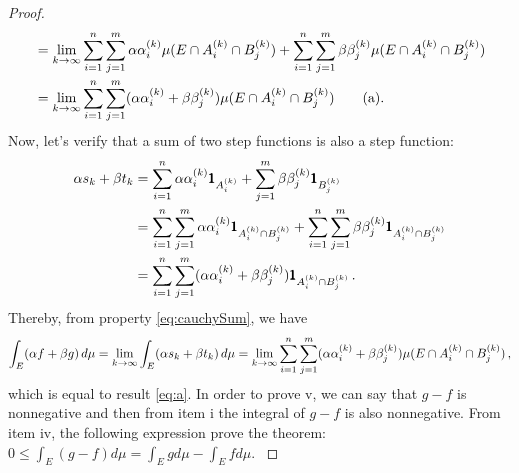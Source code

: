\begin{proof}
{\begin{align*}
&=\lim_{k\to\infty}\sum_{i=1}^n\sum_{j=1}^m\alpha\alpha_i^{(k)}\mu(E\cap A_i^{(k)}\cap B_j^{(k)}) + \sum_{i=1}^n\sum_{j=1}^m\beta\beta_j^{(k)}\mu(E\cap A_i^{(k)}\cap B_j^{(k)})\\
&=\lim_{k\to\infty}\sum_{i=1}^n\sum_{j=1}^m(\alpha\alpha_i^{(k)}+\beta\beta_j^{(k)})\mu(E\cap A_i^{(k)}\cap B_j^{(k)})\tag{a}\label{eq:a}.
\end{align*}
Now, let's verify that a sum of two step functions is also a step function:
\begin{align*}
\alpha s_k+\beta t_k&=\sum_{{i}=1}^n\alpha\alpha^{(k)}_i\pmb{1}_{A_i^{(k)}}+\sum_{{j}=1}^m\beta\beta^{(k)}_j\pmb{1}_{B_j^{(k)}}\\
&=\sum_{{i}=1}^n\sum_{{j}=1}^m\alpha\alpha^{(k)}_i\pmb{1}_{A_i^{(k)}\cap B_j^{(k)}}+\sum_{{i}=1}^n\sum_{{j}=1}^m\beta\beta^{(k)}_j\pmb{1}_{A_i^{(k)}\cap B_j^{(k)}}\\
&=\sum_{{i}=1}^n\sum_{{j}=1}^m(\alpha\alpha_i^{(k)}+\beta\beta_j^{(k)})\pmb{1}_{A_i^{(k)}\cap B_j^{(k)}}\,.
\end{align*}
Thereby, from  property \eqref{eq:cauchySum}, we have
\begin{equation*}
\int_E (\alpha f+\beta g) \,d\mu= \lim_{k\to\infty}\int_E(\alpha s_k+\beta t_k) \,d\mu= \lim_{k\to\infty}\sum_{i=1}^n\sum_{j=1}^m(\alpha\alpha_i^{(k)}+\beta\beta_j^{(k)})\mu(E\cap A_i^{(k)}\cap B_j^{(k)})\,,
\end{equation*}
which is equal to result \eqref{eq:a}. In order to prove v, we can say that $g-f$ is nonnegative and then from item i the integral of $g-f$ is also nonnegative. From item iv, the following expression prove the theorem: $0\leqslant \int_E (g-f) d\mu=\int_Eg d\mu-\int_Ef d\mu$. 
}\end{proof}


